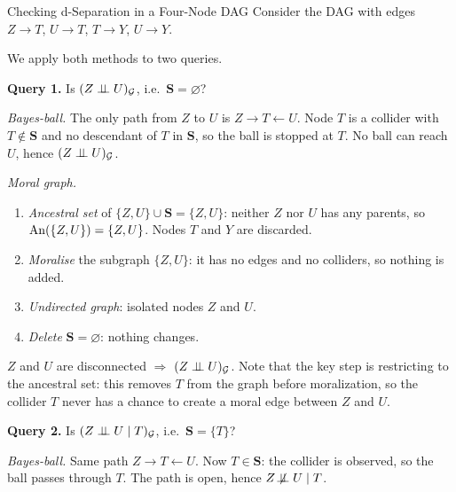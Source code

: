 \documentclass[master.tex]{subfiles}
\begin{document}
\begin{example}{Checking d-Separation in a Four-Node DAG}
\label{w2:ex:fournode}
Consider the DAG with edges $Z \to T$, $U \to T$, $T \to Y$, $U \to Y$.

\begin{center}
\end{center}

We apply both methods to two queries.

\medskip
\noindent\textbf{Query 1.} Is $(Z \perp\!\!\!\perp U)_{\mathcal{G}}$,
i.e.\ $\mathbf{S} = \varnothing$?

\medskip
\noindent\emph{Bayes-ball.}
The only path from $Z$ to $U$ is $Z \to T \leftarrow U$.
Node $T$ is a collider with $T \notin \mathbf{S}$ and no descendant of $T$
in $\mathbf{S}$, so the ball is stopped at $T$.
No ball can reach $U$, hence $(Z \perp\!\!\!\perp U)_{\mathcal{G}}$.

\medskip
\noindent\emph{Moral graph.}
\begin{enumerate}
  \item \emph{Ancestral set} of $\{Z, U\} \cup \mathbf{S} = \{Z, U\}$:
        neither $Z$ nor $U$ has any parents, so
        $\mathrm{An}(\{Z,U\}) = \{Z, U\}$.
        Nodes $T$ and $Y$ are discarded.
  \item \emph{Moralise} the subgraph $\{Z, U\}$: it has no edges and no
        colliders, so nothing is added.
  \item \emph{Undirected graph}: isolated nodes $Z$ and $U$.
  \item \emph{Delete} $\mathbf{S} = \varnothing$: nothing changes.
\end{enumerate}
$Z$ and $U$ are disconnected $\Rightarrow$ $(Z \perp\!\!\!\perp U)_{\mathcal{G}}$.
Note that the key step is restricting to the ancestral set: this removes $T$
from the graph before moralization, so the collider $T$ never has a chance
to create a moral edge between $Z$ and $U$.

\medskip
\noindent\textbf{Query 2.} Is $(Z \perp\!\!\!\perp U \mid T)_{\mathcal{G}}$,
i.e.\ $\mathbf{S} = \{T\}$?

\medskip
\noindent\emph{Bayes-ball.}
Same path $Z \to T \leftarrow U$.
Now $T \in \mathbf{S}$: the collider is observed, so the ball passes through $T$.
The path is open, hence $Z \not\!\perp\!\!\!\perp U \mid T$.


\end{example}
\end{document}

